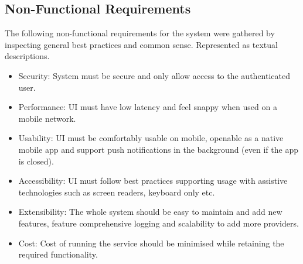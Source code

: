 \subsection{Non-Functional Requirements}
The following non-functional requirements for the system were gathered by inspecting general best practices and common sense. Represented as textual descriptions. 
\begin{itemize}
    \item Security: System must be secure and only allow access to the authenticated user. 
    \item Performance: UI must have low latency and feel snappy when used on a mobile network. 
    \item Usability: UI must be comfortably usable on mobile, openable as a native mobile app and support push notifications in the background (even if the app is closed).
    \item Accessibility: UI must follow best practices supporting usage with assistive technologies such as screen readers, keyboard only etc.
    \item Extensibility: The whole system should be easy to maintain and add new features, feature comprehensive logging and scalability to add more providers.
    \item Cost: Cost of running the service should be minimised while retaining the required functionality.
\end{itemize}
